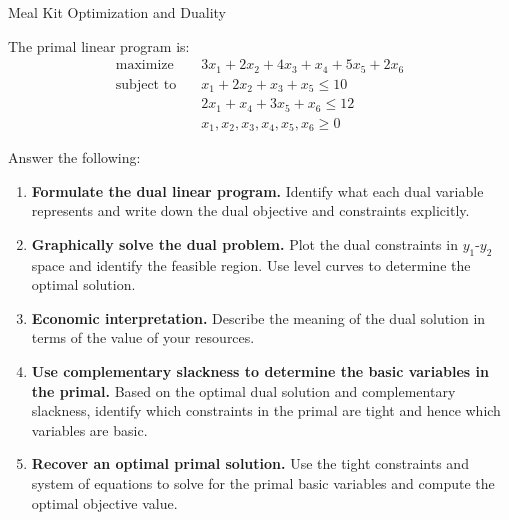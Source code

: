 \begin{ex}{Meal Kit Optimization and Duality}{}
\begin{center}
\end{center}

The primal linear program is:
\begin{align*}
\text{maximize} \quad & 3x_1 + 2x_2 + 4x_3 + x_4 + 5x_5 + 2x_6 \\
\text{subject to} \quad & x_1 + 2x_2 + x_3 + x_5 \leq 10 \\[-0.5em]
& 2x_1 + x_4 + 3x_5 + x_6 \leq 12 \\
& x_1, x_2, x_3, x_4, x_5, x_6 \geq 0
\end{align*}

Answer the following:
\begin{enumerate}
  \item \textbf{Formulate the dual linear program.}  
  Identify what each dual variable represents and write down the dual objective and constraints explicitly.

  \item \textbf{Graphically solve the dual problem.}  
  Plot the dual constraints in $y_1$-$y_2$ space and identify the feasible region. Use level curves to determine the optimal solution.

  \item \textbf{Economic interpretation.}  
  Describe the meaning of the dual solution in terms of the value of your resources.

  \item \textbf{Use complementary slackness to determine the basic variables in the primal.}  
  Based on the optimal dual solution and complementary slackness, identify which constraints in the primal are tight and hence which variables are basic.

  \item \textbf{Recover an optimal primal solution.}
  Use the tight constraints and system of equations to solve for the primal basic variables and compute the optimal objective value.
\end{enumerate}
\exrefs{\S\ref{sec:cs-solving}, \S\ref{sec:duality-economic}}
\end{ex}

